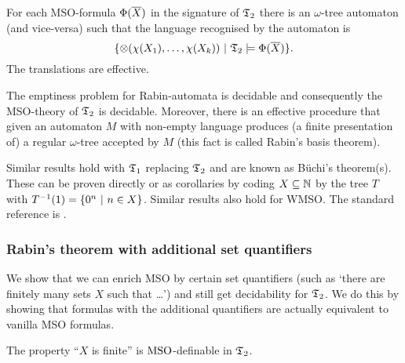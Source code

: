 \begin{theorem} \label{AS:thm:Rabin}
For each MSO-formula $\Phi(\mbox{$\overline {X}$})$ in the signature of $\mathfrak{T}_2$ there is an $\omega$-tree automaton (and vice-versa) such that the language recognised by the automaton is
\[
\{\otimes(\chi({X_1}),\dots,\chi({X_k})) \ \vert \  \mathfrak{T}_2 \models \Phi(\mbox{$\overline {X}$})\}.
\]
The translations are effective.
\end{theorem}


\begin{proposition} \cite{Thom90} \label{AS:thm:Rabin:dec}
The emptiness problem for Rabin-automata is decidable and consequently the MSO-theory of $\mathfrak{T}_2$ is decidable.
Moreover, there is an effective procedure that given an automaton $M$ with non-empty language produces (a finite presentation of) a 
regular $\omega$-tree accepted by $M$ (this fact is called Rabin's basis theorem).
\end{proposition}

Similar results hold with $\mathfrak{T}_1$ replacing $\mathfrak{T}_2$ and are known as B\"uchi's theorem(s). 
These can be proven directly or as corollaries by coding $X \subseteq \mathbb{N}$ by the tree $T$ with $T^{-1}(1) = \{0^n \ \vert \  n \in X\}$.
Similar results also hold for WMSO. The standard reference is \cite{Thom90}.

\subsubsection*{Rabin's theorem with additional set quantifiers} \label{AS:sec:beyond}


We show that we can enrich MSO by certain set quantifiers (such as `there are finitely many sets $X$ such that \dots')
and still get decidability  for $\mathfrak{T}_2$. We do this by showing that formulas with the additional quantifiers are actually equivalent to vanilla MSO formulas. 

\begin{lemma} \label{AS:lem:msofindef}
The property ``$X$ is finite'' is $\mbox{\rm MSO}$-definable in $\mathfrak{T}_2$.
\end{lemma}

